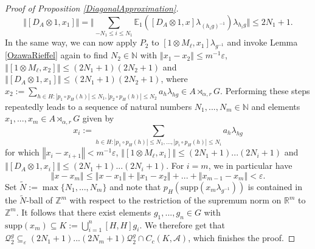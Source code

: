 \documentclass[a4paper,11pt,reqno]{amsart}
\numberwithin{equation}{section}
\numberwithin{equation}{section}
\theoremstyle{definition}
\theoremstyle{remark}
\theoremstyle{remark}
\begin{document}
\begin{proof}[{Proof of Proposition \ref{DiagonalApproximation}}]
\[
\Vert[D_{A}\otimes1,x_{1}]\Vert=\Vert\sum_{-N_{1}\leq i\leq N_{1}}\mathbb{E}_{1}([D_{A}\otimes1,x]\lambda_{(h_{i}g)^{-1}})\lambda_{h_{i}g}\Vert\leq2N_{1}+1.
\]
In the same way, we can now apply $P_{2}$ to $[1\otimes M_{\ell},x_{1}]\lambda_{g^{-1}}$
and invoke Lemma \ref{OzawaRieffel} again to find $N_{2}\in\mathbb{N}$
with $\left\Vert x_{1}-x_{2}\right\Vert \leq m^{-1}\varepsilon$,
$\left\Vert [1\otimes M_{\ell},x_{2}]\right\Vert \leq(2N_{1}+1)(2N_{2}+1)$
and $\left\Vert [D_{A}\otimes1,x_{1}]\right\Vert \leq(2N_{1}+1)(2N_{2}+1)$,
where $x_{2}:=\sum_{h\in H:\left|p_{1}\circ p_{H}(h)\right|\leq N_{1},\left|p_{2}\circ p_{H}(h)\right|\leq N_{2}}a_{h}\lambda_{hg}\in A\rtimes_{\alpha,r}G$.
Performing these steps repeatedly leads to a sequence of natural numbers
$N_{1},...,N_{m}\in\mathbb{N}$ and elements $x_{1},...,x_{m}\in A\rtimes_{\alpha,r}G$
given by 
\[
x_{i}:=\sum_{h\in H:\left|p_{1}\circ p_{H}(h)\right|\leq N_{1},...,\left|p_{i}\circ p_{H}(h)\right|\leq N_{i}}a_{h}\lambda_{hg}
\]
for which $\left\Vert x_{i}-x_{i+1}\right\Vert <m^{-1}\varepsilon$,
$\left\Vert [1\otimes M_{\ell},x_{i}]\right\Vert \leq(2N_{1}+1)...(2N_{i}+1)$
and $\left\Vert [D_{A}\otimes1,x_{i}]\right\Vert \leq(2N_{1}+1)...(2N_{i}+1)$.
For $i=m$, we in particular have 
\[
\left\Vert x-x_{m}\right\Vert \leq\left\Vert x-x_{1}\right\Vert +\left\Vert x_{1}-x_{2}\right\Vert +...+\left\Vert x_{m-1}-x_{m}\right\Vert <\varepsilon.
\]
Set $\widetilde{N}:=\max\{N_{1},...,N_{m}\}$ and note that $p_{H}(\text{supp}(x_{m}\lambda_{g^{-1}}))$
is contained in the $\widetilde{N}$-ball of $\mathbb{Z}^{m}$ with
respect to the restriction of the supremum norm on $\mathbb{R}^{m}$
to $\mathbb{Z}^{m}$. It follows that there exist elements $g_{1},...,g_{n}\in G$
with $\text{supp}(x_{m})\subseteq K:=\bigcup_{i=1}^{n}[H,H]g_{i}.$
We therefore get that $\mathcal{Q}_{2}^{g}\subseteq_{\varepsilon}(2N_{1}+1)...(2N_{m}+1)\mathcal{Q}_{2}^{g}\cap C_{c}(K,\mathcal{A})$,
which finishes the proof. \end{proof}
\end{document}
